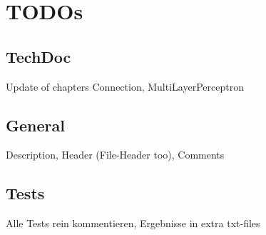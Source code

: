 \chapter{TODOs}
\section{TechDoc}
Update of chapters Connection, MultiLayerPerceptron

\section{General}
Description, Header (File-Header too), Comments







\section{Tests}
Alle Tests rein kommentieren, Ergebnisse in extra txt-files